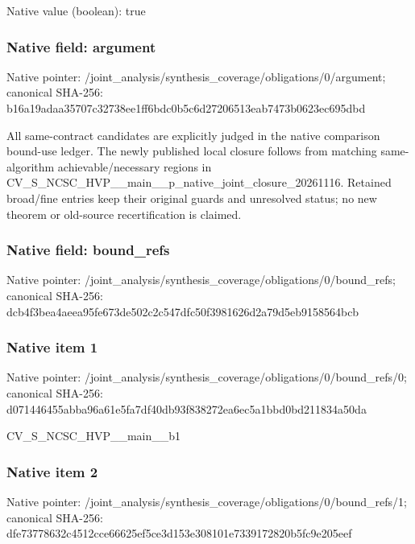 \documentclass[10pt,a4paper]{article}
\begin{document}
Native value (boolean): true

\subsubsection{Native field: argument}
Native pointer: /joint\_\allowbreak{}analysis/synthesis\_\allowbreak{}coverage/obligations/0/argument; canonical SHA-256: b16a19adaa35707c32738ee1ff6bdc0b5c6d27206513eab7473b0623ec695dbd

\begingroup\raggedright\sloppy All same-contract candidates are explicitly judged in the native comparison bound-use ledger. The newly published local closure follows from matching same-algorithm achievable/\allowbreak{}necessary regions in CV\_\allowbreak{}S\_\allowbreak{}NCSC\_\allowbreak{}HVP\_\allowbreak{}\_\allowbreak{}main\_\allowbreak{}\_\allowbreak{}p\_\allowbreak{}native\_\allowbreak{}joint\_\allowbreak{}closure\_\allowbreak{}20261116. Retained broad/\allowbreak{}fine entries keep their original guards and unresolved status;\allowbreak{} no new theorem or old-source recertification is claimed.\par\endgroup

\subsubsection{Native field: bound\_\allowbreak{}refs}
Native pointer: /joint\_\allowbreak{}analysis/synthesis\_\allowbreak{}coverage/obligations/0/bound\_\allowbreak{}refs; canonical SHA-256: dcb4f3bea4aeea95fe673de502c2c547dfc50f3981626d2a79d5eb9158564bcb

\subsubsection{Native item 1}
Native pointer: /joint\_\allowbreak{}analysis/synthesis\_\allowbreak{}coverage/obligations/0/bound\_\allowbreak{}refs/0; canonical SHA-256: d071446455abba96a61e5fa7df40db93f838272ea6ec5a1bbd0bd211834a50da

\begingroup\raggedright\sloppy CV\_\allowbreak{}S\_\allowbreak{}NCSC\_\allowbreak{}HVP\_\allowbreak{}\_\allowbreak{}main\_\allowbreak{}\_\allowbreak{}b1\par\endgroup

\subsubsection{Native item 2}
Native pointer: /joint\_\allowbreak{}analysis/synthesis\_\allowbreak{}coverage/obligations/0/bound\_\allowbreak{}refs/1; canonical SHA-256: dfe73778632c4512cce66625ef5ce3d153e308101e7339172820b5fc9e205eef
\end{document}

